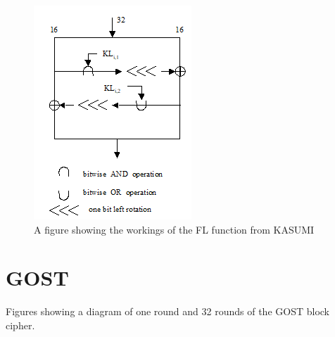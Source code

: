 \documentclass[10pt,journal,compsoc]{IEEEtran}
\begin{document}
\begin{appendices}
\begin{figure}[H]
    \centering
    \includegraphics[width=\linewidth, height=\textheight, keepaspectratio]{Figures/FL_diag.png}
    \caption{A figure showing the workings of the FL function from KASUMI}
    \label{fig:kasumi-FL}
\end{figure}

\newpage
\section{GOST}\label{appendix:GOST}
Figures showing a diagram of one round and 32 rounds of the GOST block cipher.


\end{appendices}
\end{document}
